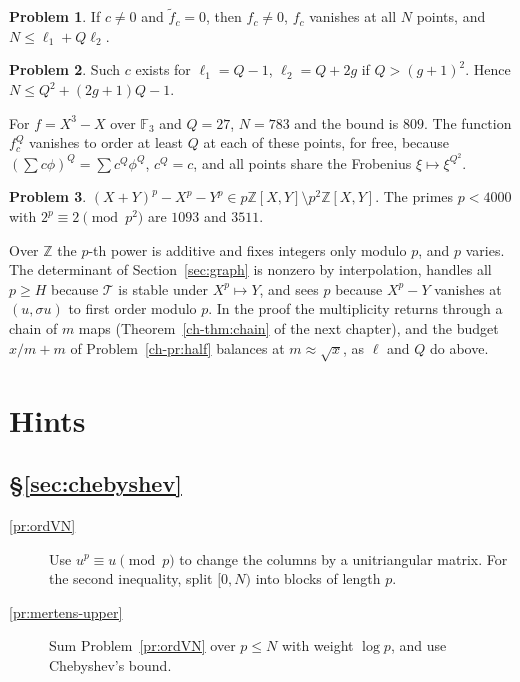 \documentclass[reqno]{amsart}
\newcounter{chap}
\theoremstyle{definition}
\newtheorem{problem}{Problem}[section]
\theoremstyle{plain}
\newcommand{\F}{\mathbb{F}}
\newcommand{\Z}{\mathbb{Z}}
\newcommand{\T}{\mathcal{T}}
\begin{document}
\begin{problem}\label{pr:bomb-power}
If \(c \ne 0\) and \(\tilde f_c = 0\), then \(f_c \ne 0\), \(f_c\) vanishes at all \(N\) points, and \(N \le \ell_1 + Q\ell_2\).
\end{problem}

\begin{problem}\label{pr:bomb-count}
Such \(c\) exists for \(\ell_1 = Q - 1\), \(\ell_2 = Q + 2g\) if \(Q > (g+1)^2\).  Hence \(N \le Q^2 + (2g+1)Q - 1\).
\end{problem}

For \(f = X^3 - X\) over \(\F_3\) and \(Q = 27\), \(N = 783\) and the bound is \(809\).  The function \(f_c^Q\) vanishes to order at least \(Q\) at each of these points, for free, because \((\sum c\phi)^Q = \sum c^Q\phi^Q\), \(c^Q = c\), and all points share the Frobenius \(\xi \mapsto \xi^{Q^2}\).

\begin{problem}\label{pr:wieferich}
\((X + Y)^p - X^p - Y^p \in p\Z[X, Y] \setminus p^2\Z[X, Y]\).  The primes \(p < 4000\) with \(2^p \equiv 2 \pmod{p^2}\) are \(1093\) and \(3511\).
\end{problem}

Over \(\Z\) the \(p\)-th power is additive and fixes integers only modulo \(p\), and \(p\) varies.  The determinant of Section~\ref{sec:graph} is nonzero by interpolation, handles all \(p \ge H\) because \(\T\) is stable under \(X^p \mapsto Y\), and sees \(p\) because \(X^p - Y\) vanishes at \((u, \sigma u)\) to first order modulo \(p\).  In the proof the multiplicity returns through a chain of \(m\) maps (Theorem~\ref{ch-thm:chain} of the next chapter), and the budget \(x/m + m\) of Problem~\ref{ch-pr:half} balances at \(m \approx \sqrt x\), as \(\ell\) and \(Q\) do above.

\section*{Hints}

\subsection*{\S\ref{sec:chebyshev}}
\begin{description}
\item[\ref{pr:ordVN}] Use \(u^p \equiv u \pmod p\) to change the columns by a unitriangular matrix.  For the second inequality, split \([0, N)\) into blocks of length \(p\).
\item[\ref{pr:mertens-upper}] Sum Problem~\ref{pr:ordVN} over \(p \le N\) with weight \(\log p\), and use Chebyshev's bound.
\end{description}
\end{document}
